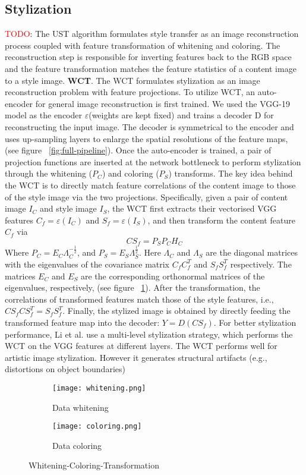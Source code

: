 \subsection{Stylization}\label{sec:method_stylization}
\textcolor{red}{TODO}: The UST algorithm formulates style transfer as an image reconstruction process coupled with feature transformation of whitening and coloring. The reconstruction step is responsible for inverting features back to the RGB space and the feature transformation matches the feature statistics of a content image to a style image.
\textbf{WCT}. The WCT \cite{bib11} formulates stylization as an image reconstruction problem with feature projections. To utilize WCT, an auto-encoder for general image reconstruction is first trained. We used the VGG-19 model \cite{bib20} as the encoder $\varepsilon$(weights are kept fixed) and trains a decoder D for reconstructing the input image. The decoder is symmetrical to the encoder and uses up-sampling layers to enlarge the spatial resolutions of the feature maps, (see figure ~\ref{fig:full-pipeline}). Once the auto-encoder is trained, a pair of projection functions are inserted at the network bottleneck to perform stylization through the whitening ($P_C$) and coloring ($P_S$) transforms. The key idea behind the WCT is to directly match feature correlations of the content image to those of the style image via the two projections. Specifically, given a pair of content image $I_C$ and style image $I_S$, the WCT first extracts their vectorised VGG features $C_f=\varepsilon(I_C)$ and $S_f=\varepsilon(I_S)$, and then transform the content feature $C_f$ via
\begin{equation}
CS_f = P_SP_CH_C
\end{equation}
Where $P_C=E_C\Lambda_C^{-\frac{1}{2}}$, and $P_S=E_S\Lambda_S^{\frac{1}{2}}$. Here $\Lambda_C$ and $\Lambda_S$ are the diagonal matrices with the eigenvalues of the covariance matrix $C_fC_f^T$ and $S_fS_f^T$ respectively. The matrices $E_C$ and $E_S$ are the corresponding orthonormal matrices of the eigenvalues, respectively, (see figure ~\ref{fig:WCT}). After the transformation, the correlations of
transformed features match those of the style features, i.e., $CS_fCS_f^T=S_fS_f^T$. Finally, the stylized image is obtained by directly feeding the transformed feature
map into the decoder: $Y = D(CS_f)$. For better stylization performance, Li et
al. \cite{bib11} use a multi-level stylization strategy, which performs the WCT on the
VGG features at different layers.
The WCT performs well for artistic image stylization. However it generates
structural artifacts (e.g., distortions on object boundaries)
\begin{figure}[h!]
	\centering
	\begin{subfigure}[b]{0.4\linewidth}
	\texttt{[image: whitening.png]}
		\caption{Data whitening}
		\end{subfigure}
	\begin{subfigure}[b]{0.4\linewidth}
	\texttt{[image: coloring.png]}
	\caption{Data coloring}
	\end{subfigure}
	\caption{Whitening-Coloring-Transformation}
	\label{fig:WCT}
\end{figure}


